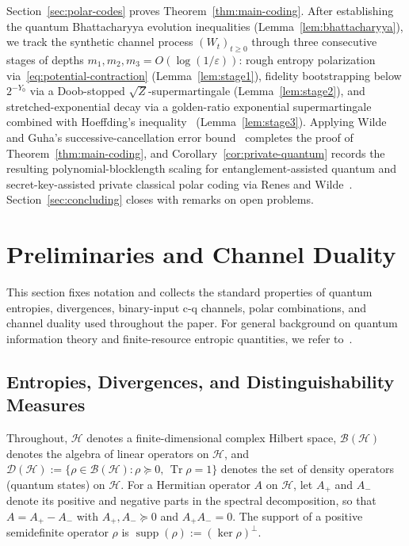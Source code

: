 \documentclass[10pt,a4paper]{article}
\numberwithin{equation}{section}
\theoremstyle{plain}
\theoremstyle{definition}
\theoremstyle{remark}
\DeclareMathOperator{\Tr}{Tr}
\DeclareMathOperator{\supp}{supp}
\newcommand{\cH}{\mathcal{H}}
\newcommand{\cD}{\mathcal{D}}
\newcommand{\cB}{\mathcal{B}}
\begin{document}
Section~\ref{sec:polar-codes} proves Theorem~\ref{thm:main-coding}. After establishing the quantum Bhattacharyya evolution inequalities (Lemma~\ref{lem:bhattacharyya}), we track the synthetic channel process $(W_t)_{t \ge 0}$ through three consecutive stages of depths $m_1, m_2, m_3 = O(\log(1/\varepsilon))$: rough entropy polarization via~\eqref{eq:potential-contraction} (Lemma~\ref{lem:stage1}), fidelity bootstrapping below $2^{-Y_0}$ via a Doob-stopped $\sqrt{Z}$-supermartingale (Lemma~\ref{lem:stage2}), and stretched-exponential decay via a golden-ratio exponential supermartingale combined with Hoeffding's inequality~\cite{Hoeffding1963} (Lemma~\ref{lem:stage3}). Applying Wilde and Guha's successive-cancellation error bound~\cite[Proposition~4]{WildeGuha2013} completes the proof of Theorem~\ref{thm:main-coding}, and Corollary~\ref{cor:private-quantum} records the resulting polynomial-blocklength scaling for entanglement-assisted quantum and secret-key-assisted private classical polar coding via Renes and Wilde~\cite{RenesWilde2014}. Section~\ref{sec:concluding} closes with remarks on open problems.

\section{Preliminaries and Channel Duality}\label{sec:preliminaries}

This section fixes notation and collects the standard properties of quantum entropies, divergences, binary-input c-q channels, polar combinations, and channel duality used throughout the paper. For general background on quantum information theory and finite-resource entropic quantities, we refer to~\cite{Wilde2013,Tomamichel2016}.

\subsection{Entropies, Divergences, and Distinguishability Measures}

Throughout, $\cH$ denotes a finite-dimensional complex Hilbert space, $\cB(\cH)$ denotes the algebra of linear operators on $\cH$, and $\cD(\cH) := \{\rho \in \cB(\cH) : \rho \succeq 0,\, \Tr \rho = 1\}$ denotes the set of density operators (quantum states) on $\cH$. For a Hermitian operator $A$ on $\cH$, let $A_+$ and $A_-$ denote its positive and negative parts in the spectral decomposition, so that $A = A_+ - A_-$ with $A_+, A_- \succeq 0$ and $A_+ A_- = 0$. The support of a positive semidefinite operator $\rho$ is $\supp(\rho) := (\ker \rho)^{\perp}$.
\end{document}
